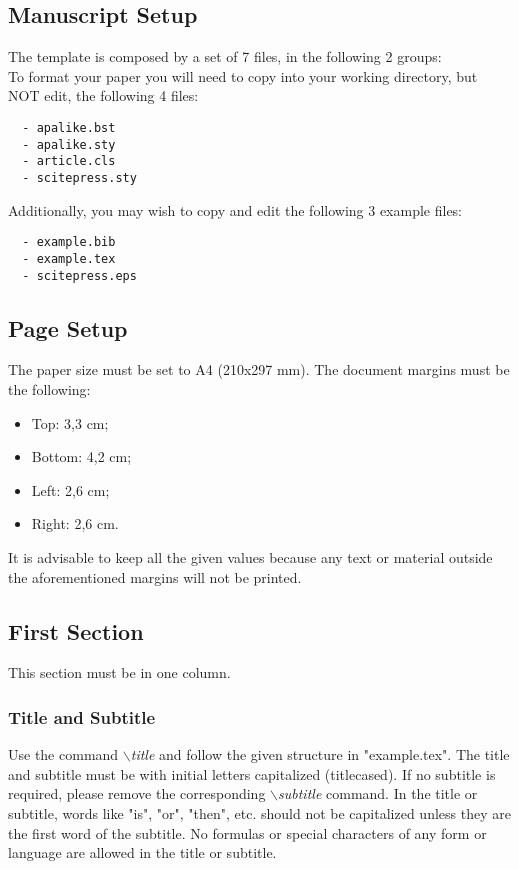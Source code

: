 \documentclass[a4paper,twoside]{article}
\begin{document}
\subsection{Manuscript Setup}

\noindent The template is composed by a set of 7 files, in the
following 2 groups:\\
 To format your paper you will need to copy
into your working directory, but NOT edit, the following 4 files:
\begin{verbatim}
  - apalike.bst
  - apalike.sty
  - article.cls
  - scitepress.sty
\end{verbatim}

 Additionally, you may wish to copy and edit
the following 3 example files:
\begin{verbatim}
  - example.bib
  - example.tex
  - scitepress.eps
\end{verbatim}


\subsection{Page Setup}

The paper size must be set to A4 (210x297 mm). The document
margins must be the following:

\begin{itemize}
    \item Top: 3,3 cm;
    \item Bottom: 4,2 cm;
    \item Left: 2,6 cm;
    \item Right: 2,6 cm.
\end{itemize}

It is advisable to keep all the given values because any text or
material outside the aforementioned margins will not be printed.

\subsection{First Section}

This section must be in one column.

\vfill
\subsubsection{Title and Subtitle}

Use the command \textit{$\backslash$title} and follow the given structure in "example.tex". The title and subtitle must be with initial letters
capitalized (titlecased). If no subtitle is required, please remove the corresponding \textit{$\backslash$subtitle} command. In the title or subtitle, words like "is", "or", "then", etc. should not be capitalized unless they are the first word of the subtitle. No formulas or special characters of any form or language are allowed in the title or subtitle.
\end{document}
